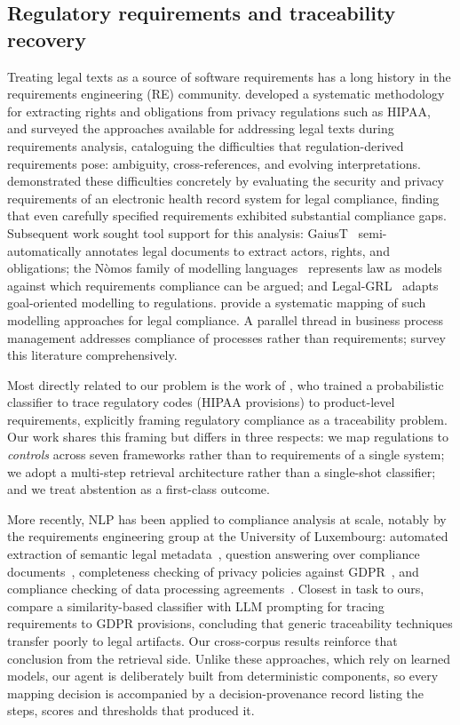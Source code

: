 \documentclass[a4paper,fleqn]{cas-sc}
\begin{document}
\subsection{Regulatory requirements and traceability recovery}
\label{sec:related-legal}

Treating legal texts as a source of software requirements has a long history in the requirements engineering (RE) community.
\citet{Breaux2008} developed a systematic methodology for extracting rights and obligations from privacy regulations such as HIPAA, and \citet{OttoAnton2007} surveyed the approaches available for addressing legal texts during requirements analysis, cataloguing the difficulties that regulation-derived requirements pose: ambiguity, cross-references, and evolving interpretations.
\citet{Massey2010} demonstrated these difficulties concretely by evaluating the security and privacy requirements of an electronic health record system for legal compliance, finding that even carefully specified requirements exhibited substantial compliance gaps.
Subsequent work sought tool support for this analysis: GaiusT~\citep{Zeni2015} semi-automatically annotates legal documents to extract actors, rights, and obligations; the N\`omos family of modelling languages~\citep{Ingolfo2011} represents law as models against which requirements compliance can be argued; and Legal-GRL~\citep{Ghanavati2014} adapts goal-oriented modelling to regulations.
\citet{Akhigbe2019} provide a systematic mapping of such modelling approaches for legal compliance.
A parallel thread in business process management addresses compliance of processes rather than requirements; \citet{Hashmi2018} survey this literature comprehensively.

Most directly related to our problem is the work of \citet{ClelandHuang2010}, who trained a probabilistic classifier to trace regulatory codes (HIPAA provisions) to product-level requirements, explicitly framing regulatory compliance as a traceability problem.
Our work shares this framing but differs in three respects: we map regulations to \emph{controls} across seven frameworks rather than to requirements of a single system; we adopt a multi-step retrieval architecture rather than a single-shot classifier; and we treat abstention as a first-class outcome.

More recently, NLP has been applied to compliance analysis at scale, notably by the requirements engineering group at the University of Luxembourg: automated extraction of semantic legal metadata~\citep{Sleimi2018}, question answering over compliance documents~\citep{Abualhaija2022}, completeness checking of privacy policies against GDPR~\citep{Amaral2022}, and compliance checking of data processing agreements~\citep{Cejas2023}.
Closest in task to ours, \citet{Etezadi2026} compare a similarity-based classifier with LLM prompting for tracing requirements to GDPR provisions, concluding that generic traceability techniques transfer poorly to legal artifacts. Our cross-corpus results reinforce that conclusion from the retrieval side.
Unlike these approaches, which rely on learned models, our agent is deliberately built from deterministic components, so every mapping decision is accompanied by a decision-provenance record listing the steps, scores and thresholds that produced it.
\end{document}
